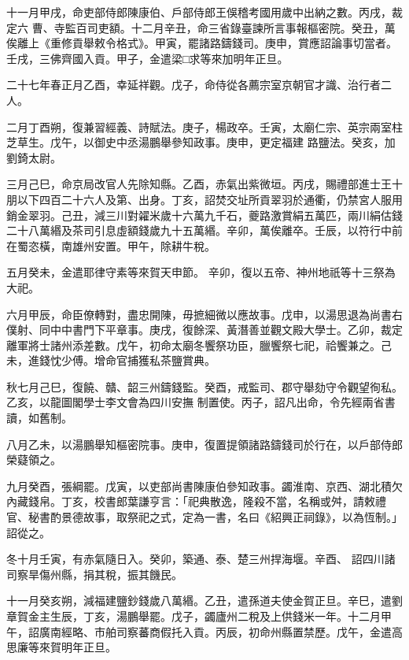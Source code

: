 \begin{pinyinscope}
 十一月甲戌，命吏部侍郎陳康伯、戶部侍郎王俁稽考國用歲中出納之數。丙戌，裁定六
 曹、寺監百司吏額。十二月辛丑，命三省錄臺諫所言事報樞密院。癸丑，萬俟離上《重修貢舉敕令格式》。甲寅，罷諸路鑄錢司。庚申，賞應詔論事切當者。壬戌，三佛齊國入貢。甲子，金遣梁□求等來加明年正旦。



 二十七年春正月乙酉，幸延祥觀。戊子，命侍從各薦宗室京朝官才識、治行者二人。



 二月丁酉朔，復兼習經義、詩賦法。庚子，楊政卒。壬寅，太廟仁宗、英宗兩室柱芝草生。戊午，以御史中丞湯鵬舉參知政事。庚申，更定福建
 路鹽法。癸亥，加劉錡太尉。



 三月己巳，命京局改官人先除知縣。乙酉，赤氣出紫微垣。丙戌，賜禮部進士王十朋以下四百二十六人及第、出身。丁亥，詔焚交址所貢翠羽於通衢，仍禁宮人服用銷金翠羽。己丑，減三川對糴米歲十六萬九千石，夔路激賞絹五萬匹，兩川絹估錢二十八萬緡及茶司引息虛額錢歲九十五萬緡。辛卯，萬俟離卒。壬辰，以符行中前在蜀恣橫，南雄州安置。甲午，除耕牛稅。



 五月癸未，金遣耶律守素等來賀天申節。
 辛卯，復以五帝、神州地祇等十三祭為大祀。



 六月甲辰，命臣僚轉對，盡忠開陳，毋摭細微以應故事。戊申，以湯思退為尚書右僕射、同中中書門下平章事。庚戌，復餘深、黃潛善並觀文殿大學士。乙卯，裁定離軍將士諸州添差數。戊午，初命太廟冬饗祭功臣，臘饗祭七祀，祫饗兼之。己未，進錢忱少傅。增命官捕獲私茶鹽賞典。



 秋七月己巳，復饒、贛、韶三州鑄錢監。癸酉，戒監司、郡守舉劾守令觀望徇私。乙亥，以龍圖閣學士李文會為四川安撫
 制置使。丙子，詔凡出命，令先經兩省書讀，如舊制。



 八月乙未，以湯鵬舉知樞密院事。庚申，復置提領諸路鑄錢司於行在，以戶部侍郎榮薿領之。



 九月癸酉，張綱罷。戊寅，以吏部尚書陳康伯參知政事。蠲淮南、京西、湖北積欠內藏錢帛。丁亥，校書郎葉謙亨言：「祀典散逸，隆殺不當，名稱或舛，請敕禮官、秘書酌景德故事，取祭祀之式，定為一書，名曰《紹興正祠錄》，以為恆制。」詔從之。



 冬十月壬寅，有赤氣隨日入。癸卯，築通、泰、楚三州捍海堰。辛酉、
 詔四川諸司察旱傷州縣，捐其稅，振其饑民。



 十一月癸亥朔，減福建鹽鈔錢歲八萬緡。乙丑，遣孫道夫使金賀正旦。辛巳，遣劉章賀金主生辰，丁亥，湯鵬舉罷。戊子，蠲廬州二稅及上供錢米一年。十二月甲午，詔廣南經略、市舶司察蕃商假托入貢。丙辰，初命州縣置禁歷。戊午，金遣高思廉等來賀明年正旦。




\end{pinyinscope}
